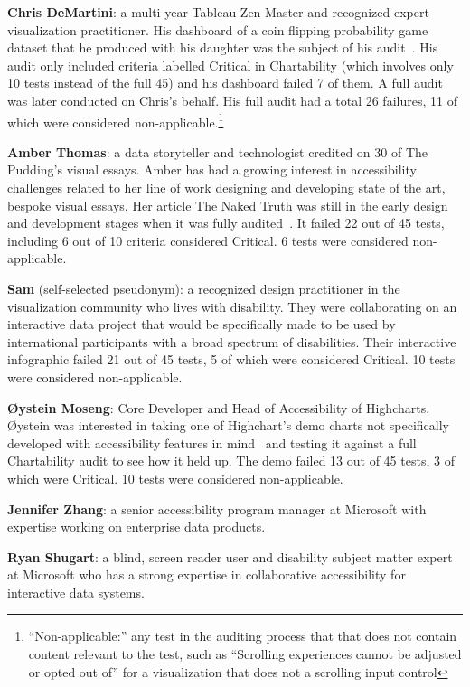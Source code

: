 \documentclass{egpubl}
\begin{document}
\textbf{Chris DeMartini}: a multi-year Tableau Zen Master and recognized expert visualization practitioner. His dashboard of a coin flipping probability game dataset that he produced with his daughter was the subject of his audit~\cite{noauthor_we_nodate}. His audit only included criteria labelled Critical in Chartability (which involves only 10 tests instead of the full 45) and his dashboard failed 7 of them. A full audit was later conducted on Chris’s behalf. His full audit had a total 26 failures, 11 of which were considered non-applicable.\footnote{``Non-applicable:'' any test in the auditing process that that does not contain content relevant to the test, such as ``Scrolling experiences cannot be adjusted or opted out of'' for a visualization that does not a scrolling input control\label{fnlabel}}

\textbf{Amber Thomas}: a data storyteller and technologist credited on 30 of The Pudding's visual essays. Amber has had a growing interest in accessibility challenges related to her line of work designing and developing state of the art, bespoke visual essays. Her article The Naked Truth was still in the early design and development stages when it was fully audited~\cite{noauthor_naked_nodate}. It failed 22 out of 45 tests, including 6 out of 10 criteria considered Critical. 6 tests were considered non-applicable.

\textbf{Sam} (self-selected pseudonym): a recognized design practitioner in the visualization community who lives with disability. They were collaborating on an interactive data project that would be specifically made to be used by international participants with a broad spectrum of disabilities. Their interactive infographic failed 21 out of 45 tests, 5 of which were considered Critical. 10 tests were considered non-applicable.

\textbf{Øystein Moseng}: Core Developer and Head of Accessibility of Highcharts. Øystein was interested in taking one of Highchart’s demo charts not specifically developed with accessibility features in mind~\cite{noauthor_fixed_nodate} and testing it against a full Chartability audit to see how it held up. The demo failed 13 out of 45 tests, 3 of which were Critical. 10 tests were considered non-applicable.

\textbf{Jennifer Zhang}: a senior accessibility program manager at Microsoft with expertise working on enterprise data products.

\textbf{Ryan Shugart}: a blind, screen reader user and disability subject matter expert at Microsoft who has a strong expertise in collaborative accessibility for interactive data systems. 
\end{document}
